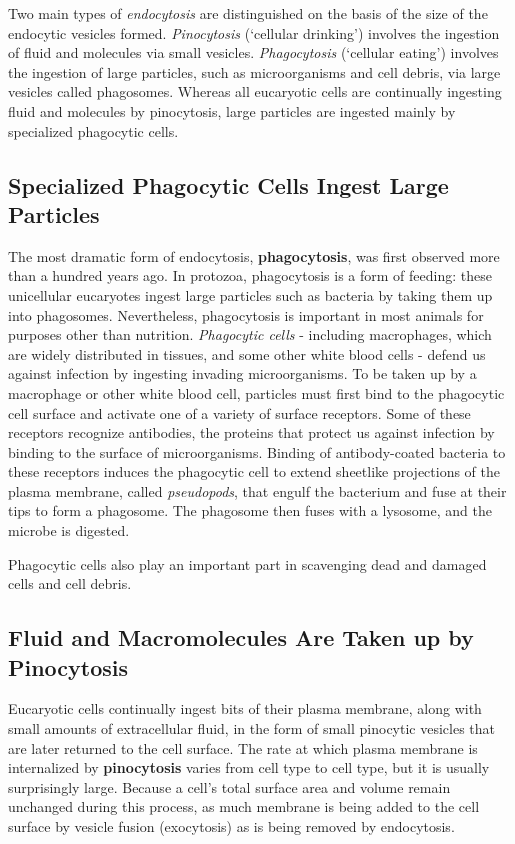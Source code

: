 Two main types of \textit{endocytosis} are distinguished on the basis of
the size of the endocytic vesicles formed. \textit{Pinocytosis} (`cellular drinking') 
involves the ingestion of fluid and molecules via small vesicles. 
\textit{Phagocytosis} (‘cellular eating’) involves the ingestion 
of large particles, such as microorganisms and cell debris, via large
vesicles called phagosomes. Whereas all
eucaryotic cells are continually ingesting fluid and molecules by pinocytosis, 
large particles are ingested mainly by specialized phagocytic cells.

\subsection{Specialized Phagocytic Cells Ingest Large Particles}

The most dramatic form of endocytosis, \textbf{phagocytosis}, was first observed
more than a hundred years ago. In protozoa, phagocytosis is a form of
feeding: these unicellular eucaryotes ingest large particles such as bacteria 
by taking them up into phagosomes. Nevertheless, phagocytosis is important in most animals for purposes
other than nutrition. \textit{Phagocytic cells} - including macrophages, which are
widely distributed in tissues, and some other white blood cells - defend us
against infection by ingesting invading microorganisms. To be taken up
by a macrophage or other white blood cell, particles must first bind to the
phagocytic cell surface and activate one of a variety of surface receptors.
Some of these receptors recognize antibodies, the proteins that protect
us against infection by binding to the surface of microorganisms. Binding
of antibody-coated bacteria to these receptors induces the phagocytic
cell to extend sheetlike projections of the plasma membrane, called
\textit{pseudopods}, that engulf the bacterium and fuse at their
tips to form a phagosome. The phagosome then fuses with a lysosome,
and the microbe is digested.

Phagocytic cells also play an important part in scavenging dead and damaged 
cells and cell debris.

\subsection{Fluid and Macromolecules Are Taken up by Pinocytosis}

Eucaryotic cells continually ingest bits of their plasma membrane, along
with small amounts of extracellular fluid, in the form of small pinocytic
vesicles that are later returned to the cell surface. The rate at which
plasma membrane is internalized by \textbf{pinocytosis} varies from cell type to
cell type, but it is usually surprisingly large.
Because a cell’s total surface area and volume remain unchanged during
this process, as much membrane is being added to the cell surface by
vesicle fusion (exocytosis) as is being removed by endocytosis.

